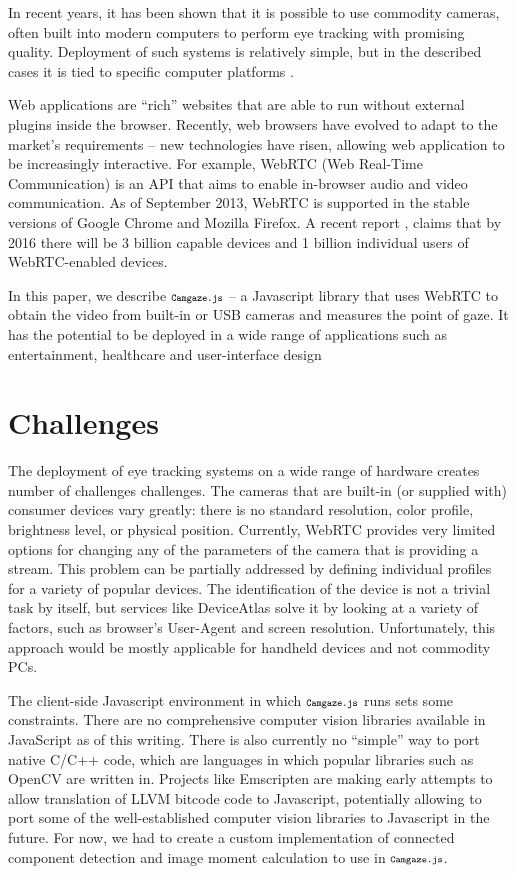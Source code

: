 \documentclass[annual]{acmsiggraph}
\newcommand{\Acronym}[1]{\ensuremath{{\small{\texttt{#1}}}}}
\newcommand{\Name}{\Acronym{Camgaze.js}} \newcommand{\False}{\Constant{false}}
\newcommand{\Constant}[1]{\ensuremath{\small{\texttt{#1}}}}
\begin{document}
In recent years, it has been shown \cite{SanAgustin2009}\cite{Sewell2010}
that it is possible to use commodity cameras, often built into modern
computers to perform eye tracking with promising quality. Deployment of such
systems is relatively simple, but in the described cases it is tied to specific
computer platforms \cite{holland2012eye}.

Web applications are “rich” websites that are able to run without external
plugins inside the browser. Recently, web browsers have evolved to adapt to
the market’s requirements -- new technologies have risen, allowing web
application to be increasingly interactive. For example, WebRTC (Web Real-Time
Communication) is an API that aims to enable in-browser audio and video
communication. As of September 2013, WebRTC is supported in the stable versions
of Google Chrome and Mozilla Firefox. A recent report
\cite{DisruptiveAnalysis2013}, claims that by 2016 there will be
3 billion capable devices and 1 billion individual users of WebRTC-enabled
devices.

In this paper, we describe $\Name$ -- a Javascript library that uses WebRTC to
obtain the video from built-in or USB cameras and measures the point of gaze.
It has the potential to be deployed in a wide range of applications such as
entertainment, healthcare and user-interface design



\section{Challenges}

The deployment of eye tracking systems on a wide range of hardware creates
number of challenges challenges.  The cameras that are built-in (or supplied
with) consumer devices vary greatly: there is no standard resolution, color
profile, brightness level, or physical position. Currently, WebRTC provides
very limited options for changing any of the parameters of the camera that is
providing a stream. This problem can be partially addressed by defining
individual profiles for a variety of popular devices. The identification of the
device is not a trivial task by itself, but services like DeviceAtlas
\cite{DeviceAtlas2013} solve it by looking at a variety of factors, such as
browser’s User-Agent and screen resolution.  Unfortunately, this approach would
be mostly applicable for handheld devices and not commodity PCs.

The client-side Javascript environment in which $\Name$ runs sets some
constraints. There are no comprehensive computer vision libraries available in
JavaScript as of this writing.  There is also currently no “simple” way to port
native C/C++ code, which are languages in which popular libraries such as
OpenCV are written in.  Projects like Emscripten are making early attempts to
allow translation of LLVM bitcode code to Javascript, potentially allowing to
port some of the well-established computer vision libraries to Javascript in
the future. For now, we had to create a custom implementation of connected
component detection and image moment calculation to use in $\Name$.
\end{document}
